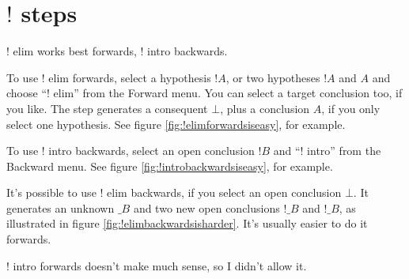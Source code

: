 \documentclass[11pt]{book}
\newcommand{\figref}[1]{figure \ref{fig:#1}}
\begin{document}
\section{$!$ steps}

$!$ elim works best forwards, $!$ intro backwards.

To use $!$ elim forwards, select a hypothesis $!A$, or two hypotheses $!A$ and $A$ and choose ``$!$ elim'' from the Forward menu. You can select a target conclusion too, if you like. The step generates a consequent $\bot$, plus a conclusion $A$, if you only select one hypothesis. See \figref{!elimforwardsiseasy}, for example.

To use $!$ intro backwards, select an open conclusion $!B$ and ``$!$ intro'' from the Backward menu. See \figref{!introbackwardsiseasy}, for example.

It's possible to use $!$ elim backwards, if you select an open conclusion $\bot$. It generates an unknown $\_B$ and two new open conclusions $!\_B$ and $!\_B$, as illustrated in \figref{!elimbackwardsisharder}. It's usually easier to do it forwards.

$!$ intro forwards doesn't make much sense, so I didn't allow it.


%


%
\end{document}
